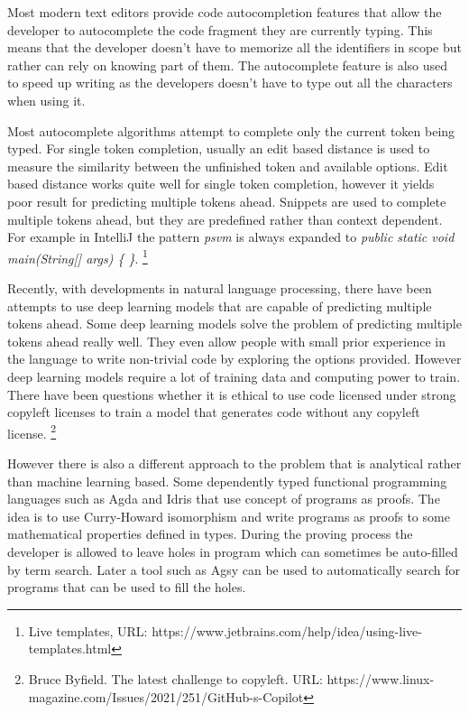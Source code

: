Most modern text editors provide code autocompletion features that allow the developer to autocomplete the code fragment they are currently typing.
This means that the developer doesn't have to memorize all the identifiers in scope but rather can rely on knowing part of them.
The autocomplete feature is also used to speed up writing as the developers doesn't have to type out all the characters when using it. \cite{how-programmers-interact-with-code-generation-models}

Most autocomplete algorithms attempt to complete only the current token being typed.
For single token completion, usually an edit based distance is used to measure the similarity between the unfinished token and available options.
Edit based distance works quite well for single token completion, however it yields poor result for predicting multiple tokens ahead.
Snippets are used to complete multiple tokens ahead, but they are predefined rather than context dependent.
For example in IntelliJ the pattern \textit{psvm} is always expanded to \textit{public static void main(String[] args) \{ \}}. \footnote{Live templates, URL: https://www.jetbrains.com/help/idea/using-live-templates.html}

Recently, with developments in natural language processing, there have been attempts to use deep learning models that are capable of predicting multiple tokens ahead.
Some deep learning models solve the problem of predicting multiple tokens ahead really well.
They even allow people with small prior experience in the language to write non-trivial code by exploring the options provided. \cite{automated-code-generation-using-deeplearning}
However deep learning models require a lot of training data and computing power to train.
There have been questions whether it is ethical to use code licensed under strong copyleft licenses to train a model that generates code without any copyleft license. \footnote{Bruce Byfield. The latest challenge to copyleft. URL: https://www.linux-magazine.com/Issues/2021/251/GitHub-s-Copilot}

However there is also a different approach to the problem that is analytical rather than machine learning based.
Some dependently typed functional programming languages such as Agda and Idris that use concept of programs as proofs.
The idea is to use Curry-Howard isomorphism and write programs as proofs to some mathematical properties defined in types.
During the proving process the developer is allowed to leave holes in program which can sometimes be auto-filled by term search.
Later a tool such as Agsy can be used to automatically search for programs that can be used to fill the holes.\cite{tool-for-automatic-theorem-proving-in-agda}

